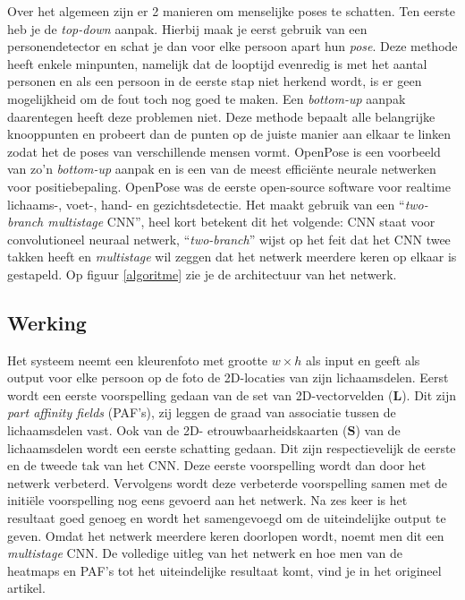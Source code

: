 \documentclass[a4paper,twoside,kulak]{kulakreport}
\begin{document}
Over het algemeen zijn er 2 manieren om menselijke poses te schatten. Ten eerste heb je de \textit{top-down} aanpak. Hierbij maak je eerst gebruik van een personendetector en schat je dan voor elke persoon apart hun \emph{pose}.  Deze methode heeft enkele minpunten, namelijk dat de looptijd evenredig is met het aantal personen en als een persoon in de eerste stap niet herkend wordt, is er geen mogelijkheid om de fout toch nog goed te maken. Een \textit{bottom-up} aanpak daarentegen heeft deze problemen niet. Deze methode bepaalt alle belangrijke knooppunten en probeert dan de punten op de juiste manier aan elkaar te linken zodat het de poses van verschillende mensen vormt. OpenPose is een voorbeeld van zo’n \textit{bottom-up} aanpak en is een van de meest efficiënte neurale netwerken voor positiebepaling. OpenPose was de eerste open-source software voor realtime lichaams-, voet-, hand- en gezichtsdetectie. Het maakt gebruik van een “\textit{two-branch multistage} CNN”, heel kort betekent dit het volgende: CNN staat voor convolutioneel neuraal netwerk, “\textit{two-branch}” wijst op het feit dat het CNN twee takken heeft en \textit{multistage} wil zeggen dat het netwerk meerdere keren op elkaar is gestapeld. Op figuur \ref{algoritme} zie je de architectuur van het netwerk.

\subsection{Werking}

Het systeem neemt een kleurenfoto met grootte $w \times h$ als input en geeft als output voor elke persoon op de foto de 2D-locaties van zijn lichaamsdelen. Eerst wordt een eerste voorspelling gedaan van de set van 2D-vectorvelden ($\textbf{L}$). Dit zijn \textit{part affinity fields} (PAF's), zij leggen de graad van associatie tussen de lichaamsdelen vast. Ook van de 2D- etrouwbaarheidskaarten ($\textbf{S}$) van de lichaamsdelen wordt een eerste schatting gedaan. Dit zijn respectievelijk de eerste en de tweede tak van het CNN. Deze eerste voorspelling wordt dan door het netwerk verbeterd. Vervolgens wordt deze verbeterde voorspelling samen met de initiële voorspelling nog eens gevoerd aan het netwerk. Na zes keer is het resultaat goed genoeg en wordt het samengevoegd om de uiteindelijke output te geven. Omdat het netwerk meerdere keren doorlopen wordt, noemt men dit een \textit{multistage} CNN. De volledige uitleg van het netwerk en hoe men van de heatmaps en PAF's tot het uiteindelijke resultaat komt, vind je in het origineel artikel.\cite{cao2019openpose}
\end{document}
